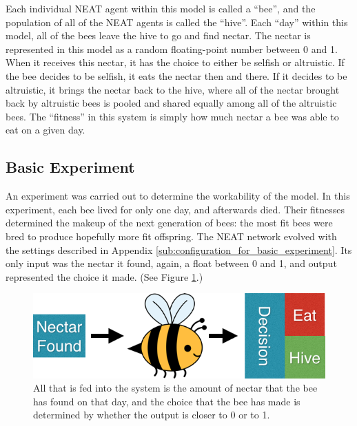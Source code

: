\documentclass[11pt]{article}
\begin{document}
			Each individual NEAT agent within this model is called a ``bee'', and the population of all of the NEAT agents is called the ``hive''. Each ``day'' within this model, all of the bees leave the hive to go and find nectar. The nectar is represented in this model as a random floating-point number between 0 and 1. When it receives this nectar, it has the choice to either be selfish or altruistic. If the bee decides to be selfish, it eats the nectar then and there. If it decides to be altruistic, it brings the nectar back to the hive, where all of the nectar brought back by altruistic bees is pooled and shared equally among all of the altruistic bees. The ``fitness'' in this system is simply how much nectar a bee was able to eat on a given day.

		\subsection{Basic Experiment} %
		\label{sub:basic_experiment}
			An experiment was carried out to determine the workability of the model. In this experiment, each bee lived for only one day, and afterwards died. Their fitnesses determined the makeup of the next generation of bees: the most fit bees were bred to produce hopefully more fit offspring. The NEAT network evolved with the settings described in Appendix \ref{sub:configuration_for_basic_experiment}. Its only input was the nectar it found, again, a float between 0 and 1, and output represented the choice it made. (See Figure \ref{fig:naive_system}.)

			\begin{figure}[tbph!]
				\begin{center}
					\includegraphics[scale=.5]{bee_diagrams/naive_system.png}
				\end{center}
				\caption{All that is fed into the system is the amount of nectar that the bee has found on that day, and the choice that the bee has made is determined by whether the output is closer to 0 or to 1.}
				\label{fig:naive_system}
			\end{figure}
\end{document}
